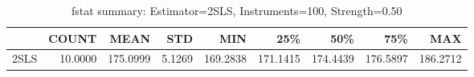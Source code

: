\begin{table}[ht]
\centering
\caption{fstat summary: Estimator=2SLS, Instruments=100, Strength=0.50}
\begin{tabular}{lrrrrrrrr}
\toprule
 & COUNT & MEAN & STD & MIN & 25\% & 50\% & 75\% & MAX \\
\midrule
2SLS & 10.0000 & 175.0999 & 5.1269 & 169.2838 & 171.1415 & 174.4439 & 176.5897 & 186.2712 \\
\bottomrule
\end{tabular}
\end{table}
